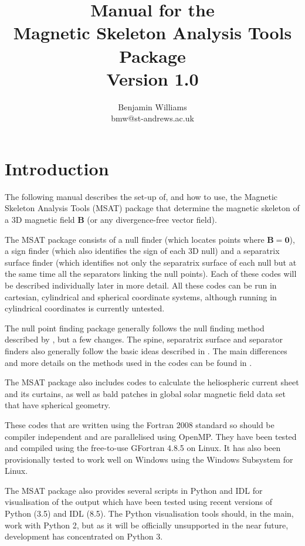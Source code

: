 \documentclass[12pt]{article}
\author{Benjamin Williams \\ bmw@st-andrews.ac.uk}
\title{Manual for the \\ Magnetic Skeleton Analysis Tools Package \\ \( \; \) \\ Version 1.0}
\renewcommand{\vec}[1]{\mathbf{#1}}
\begin{document}
  \maketitle

  \tableofcontents

  \newpage

  \section{Introduction}

    The following manual describes the set-up of, and how to use, the Magnetic Skeleton Analysis Tools (MSAT) package that determine the magnetic skeleton of a 3D magnetic field \( \vec{B} \) (or any divergence-free vector field).

    The MSAT package consists of a null finder (which locates points where \( \vec{B} = \vec{0} \)), a sign finder (which also identifies the sign of each 3D null) and a separatrix surface finder (which identifies not only the separatrix surface of each null but at the same time all the separators linking the null points). Each of these codes will be described individually later in more detail.  All these codes can be run in cartesian, cylindrical and spherical coordinate systems, although running in cylindrical coordinates is currently untested.

    The null point finding package generally follows the null finding method described by \cite{Haynes2007}, but a few changes. The spine, separatrix surface and separator finders also generally follow the basic ideas described in \cite{Haynes2007}. The main differences and more details on the methods used in the codes can be found in \cite{WilliamsPhD2018}.

    The MSAT package also includes codes to calculate the heliospheric current sheet and its curtains, as well as bald patches in global solar magnetic field data set that have spherical geometry.

    These codes that are written using the Fortran 2008 standard so should be compiler independent and are parallelised using OpenMP. They have been tested and compiled using the free-to-use GFortran 4.8.5 on Linux. It has also been provisionally tested to work well on Windows using the Windows Subsystem for Linux.

    The MSAT package also provides several scripts in Python and IDL for visualisation of the output which have been tested using recent versions of Python (3.5) and IDL (8.5). The Python visualisation tools should, in the main, work with Python 2, but as it will be officially unsupported in the near future, development has concentrated on Python 3.
\end{document}
